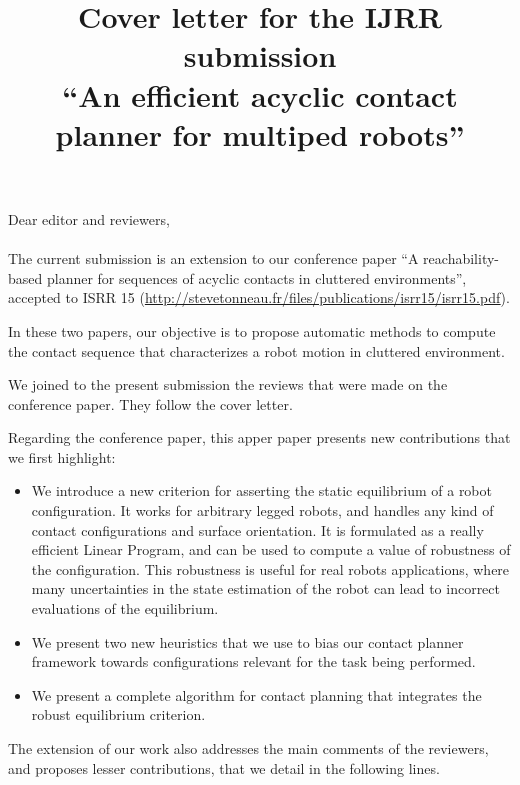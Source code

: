 \documentclass[a4paper]{article}
\author {}
\title {Cover letter for the IJRR submission \\ ``An efficient acyclic contact planner for multiped robots''}
\date {}
\begin{document}
\maketitle

Dear editor and reviewers, \\ \\

The current submission is an extension to our conference paper ``A reachability-based planner for sequences of acyclic contacts in
cluttered environments'', accepted to ISRR 15 (\url{http://stevetonneau.fr/files/publications/isrr15/isrr15.pdf}).

In these two papers, our objective is to propose automatic methods
to compute the contact sequence that characterizes a robot motion in
cluttered environment.

We joined to the present submission the reviews that were made on the
conference paper. They follow the cover letter.

Regarding the conference paper, this apper paper presents new contributions that we first highlight:

\begin{itemize}
\item We introduce a new criterion for asserting the static equilibrium of a robot configuration. It works for arbitrary
legged robots, and handles any kind of contact configurations and surface orientation. It is formulated as a really efficient Linear Program, and 
can be used to compute a value of robustness of the configuration. This robustness is useful for real robots applications, where many uncertainties
in the state estimation of the robot can lead to incorrect evaluations of the equilibrium.
\item We present two new heuristics that we use to bias our contact planner framework towards configurations relevant for the task being performed.
\item We present a complete algorithm for contact planning that integrates the robust equilibrium criterion.
\end{itemize}

The extension of our work also addresses the main comments of the reviewers, and proposes lesser contributions,
that we detail in the following lines.
\end{document}
